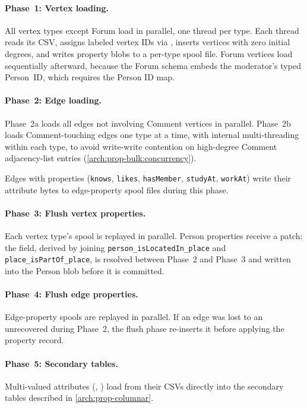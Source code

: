 \paragraph{Phase~1: Vertex loading.}
All vertex types except Forum load in parallel, one thread per type.
Each thread reads its CSV, assigns labeled vertex IDs via , inserts vertices with zero initial degrees, and writes property blobs to a per-type spool file.
Forum vertices load sequentially afterward, because the Forum schema embeds the moderator's typed Person~ID, which requires the Person ID map.

\paragraph{Phase~2: Edge loading.}
Phase~2a loads all edges not involving Comment vertices in parallel.
Phase~2b loads Comment-touching edges one type at a time, with internal multi-threading within each type, to avoid write-write contention on high-degree Comment adjacency-list entries (\autoref{arch:prop-bulk:concurrency}).

Edges with properties (\texttt{knows}, \texttt{likes}, \texttt{hasMember}, \texttt{studyAt}, \texttt{workAt}) write their attribute bytes to edge-property spool files during this phase.

\paragraph{Phase~3: Flush vertex properties.}
Each vertex type's spool is replayed in parallel.
Person properties receive a patch: the  field, derived by joining \texttt{person\_isLocatedIn\_place} and \texttt{place\_isPartOf\_place}, is resolved between Phase~2 and Phase~3 and written into the Person blob before it is committed.

\paragraph{Phase~4: Flush edge properties.}
Edge-property spools are replayed in parallel.
If an edge was lost to an unrecovered  during Phase~2, the flush phase re-inserts it before applying the property record.

\paragraph{Phase~5: Secondary tables.}
Multi-valued attributes (, ) load from their CSVs directly into the secondary tables described in \autoref{arch:prop-columnar}.

